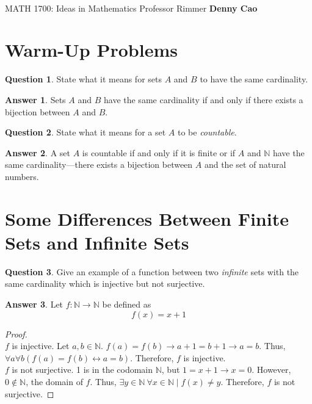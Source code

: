 \documentclass[article, 12pt]{article}
\title{\LARGE\bf{\psetName}}
\author{\name}
\date{\dueDate}
\author{\name}
\date{\dueDate}
\makeatletter
\theoremstyle{definition}
\newcommand{\courseNumber}{MATH 1700}
\newcommand{\courseName}{Ideas in Mathematics}
\newcommand{\professor}{Professor Rimmer}
\newcommand{\name}{Denny Cao}
\newtheorem{question}{Question}
\newtheorem{answer}{Answer}
\newcommand{\nats}{\mathbb{N}}
\renewcommand{\maketitle}{\bgroup\setlength{\parindent}{0pt}
    \begin{flushleft}
        \textbf{\@title} \\ \vskip0.2cm
        \begingroup
            \fontsize{14pt}{12pt}\selectfont
            \courseNumber: \courseName 
            \vskip0.3cm 
            \professor
        \endgroup \vskip0.3cm
        \@date \hfill\rlap{}\bf{\name} \\ \vskip0.1cm
        \hrulefill
    \end{flushleft}\egroup 
}
\makeatother
\begin{document}
    \maketitle
    \thispagestyle{empty}

    \section{Warm-Up Problems}
    \begin{question}
        State what it means for sets $A$ and $B$ to have the same cardinality.
    \end{question}

    \begin{answer}
        Sets $A$ and $B$ have the same cardinality if and only if there exists a bijection between $A$ and $B$.
    \end{answer}

    \begin{question}
        State what it means for a set $A$ to be \textit{countable}.
    \end{question}

    \begin{answer}
        A set $A$ is countable if and only if it is finite or if $A$ and $\nats$ have the same cardinality---there exists a bijection between $A$ and the set of natural numbers.
    \end{answer}

    \section{Some Differences Between Finite Sets and Infinite Sets}
    \begin{question}
        Give an example of a function between two \textit{infinite} sets with the same cardinality which is injective but not surjective.
    \end{question}

    \begin{answer}
        Let $f: \nats \to \nats$ be defined as 
        \[ f(x) = x + 1 \]
        \begin{proof} \ \\
            $f$ is injective. Let $a,b \in \nats$. $f(a) = f(b) \to a + 1 = b + 1 \to a = b$. Thus, $\forall a \forall b (f(a) = f(b) \leftrightarrow a = b)$. Therefore, $f$ is injective.
            \\[12pt]
            $f$ is not surjective. 1 is in the codomain $\nats$, but $1 = x + 1 \to x = 0$. However, $0 \not\in \nats$, the domain of $f$. Thus, $\exists y \in \nats \ \forall x \in \nats \mid f(x) \neq y$. Therefore, $f$ is not surjective.
        \end{proof}
    \end{answer}
\end{document}
